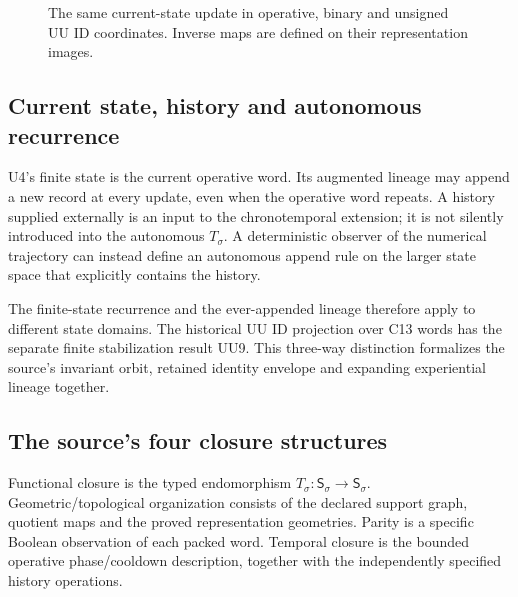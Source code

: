 \documentclass[11pt,a4paper]{article}
\numberwithin{equation}{section}
\begin{document}
\begin{figure}[H]\centering
{}
\caption{The same current-state update in operative, binary and unsigned UU ID coordinates. Inverse maps are defined on their representation images.}
\end{figure}

\subsection{Current state, history and autonomous recurrence}
U4's finite state is the current operative word. Its augmented lineage may append a new record at every update, even when the operative word repeats. A history supplied externally is an input to the chronotemporal extension; it is not silently introduced into the autonomous $T_\sigma$. A deterministic observer of the numerical trajectory can instead define an autonomous append rule on the larger state space that explicitly contains the history.

The finite-state recurrence and the ever-appended lineage therefore apply to different state domains. The historical UU ID projection over C13 words has the separate finite stabilization result UU9. This three-way distinction formalizes the source's invariant orbit, retained identity envelope and expanding experiential lineage together.

\subsection{The source's four closure structures}
Functional closure is the typed endomorphism $T_\sigma:\mathsf S_\sigma\to\mathsf S_\sigma$. Geometric/topological organization consists of the declared support graph, quotient maps and the proved representation geometries. Parity is a specific Boolean observation of each packed word. Temporal closure is the bounded operative phase/cooldown description, together with the independently specified history operations.
\end{document}
